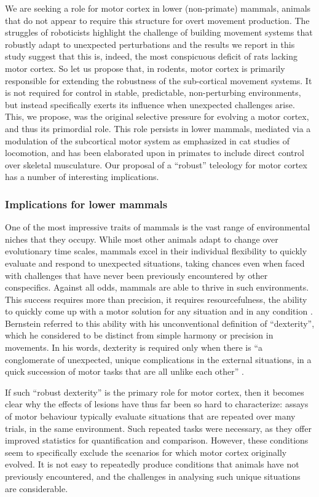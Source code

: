 We are seeking a role for motor cortex in lower (non-primate) mammals, animals that do not appear to require this structure for overt movement production. The struggles of roboticists highlight the challenge of building movement systems that robustly adapt to unexpected perturbations and the results we report in this study suggest that this is, indeed, the most conspicuous deficit of rats lacking motor cortex. So let us propose that, in rodents, motor cortex is primarily responsible for extending the robustness of the sub-cortical movement systems. It is not required for control in stable, predictable, non-perturbing environments, but instead specifically exerts its influence when unexpected challenges arise. This, we propose, was the original selective pressure for evolving a motor cortex, and thus its primordial role. This role persists in lower mammals, mediated via a modulation of the subcortical motor system as emphasized in cat studies of locomotion, and has been elaborated upon in primates to include direct control over skeletal musculature. Our proposal of a ``robust'' teleology for motor cortex has a number of interesting implications.

\subsubsection*{Implications for lower mammals}

One of the most impressive traits of mammals is the vast range of environmental niches that they occupy. While most other animals adapt to change over evolutionary time scales, mammals excel in their individual flexibility to quickly evaluate and respond to unexpected situations, taking chances even when faced with challenges that have never been previously encountered by other conspecifics. Against all odds, mammals are able to thrive in such environments. This success requires more than precision, it requires resourcefulness, the ability to quickly come up with a motor solution for any situation and in any condition \cite{Bernstein1996}. Bernstein referred to this ability with his unconventional definition of ``dexterity'', which he considered to be distinct from simple harmony or precision in movements. In his words, dexterity is required only when there is \enquote{a conglomerate of unexpected, unique complications in the external situations, in a quick succession of motor tasks that are all unlike each other} \cite{Bernstein1996}.

If such ``robust dexterity'' is the primary role for motor cortex, then it becomes clear why the effects of lesions have thus far been so hard to characterize: assays of motor behaviour typically evaluate situations that are repeated over many trials, in the same environment. Such repeated tasks were necessary, as they offer improved statistics for quantification and comparison. However, these conditions seem to specifically exclude the scenarios for which motor cortex originally evolved. It is not easy to repeatedly produce conditions that animals have not previously encountered, and the challenges in analysing such unique situations are considerable.

